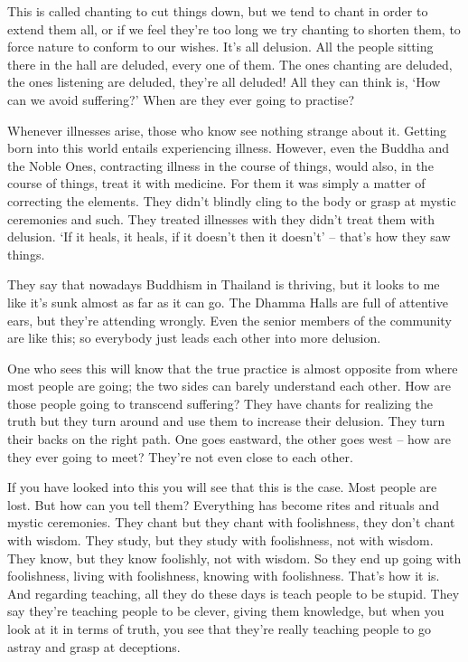 This is called chanting to cut things down, but we tend to chant in order to extend them all, or if we feel they're too long we try chanting to shorten them, to force nature to conform to our wishes. It's all delusion. All the people sitting there in the hall are deluded, every one of them. The ones chanting are deluded, the ones listening are deluded, they're all deluded! All they can think is, `How can we avoid suffering?' When are they ever going to practise?

Whenever illnesses arise, those who know see nothing strange about it. Getting born into this world entails experiencing illness. However, even the Buddha and the Noble Ones, contracting illness in the course of things, would also, in the course of things, treat it with medicine. For them it was simply a matter of correcting the elements. They didn't blindly cling to the body or grasp at mystic ceremonies and such. They treated illnesses with  they didn't treat them with delusion. `If it heals, it heals, if it doesn't then it doesn't' -- that's how they saw things.

They say that nowadays Buddhism in Thailand is thriving, but it looks to me like it's sunk almost as far as it can go. The Dhamma Halls are full of attentive ears, but they're attending wrongly. Even the senior members of the community are like this; so everybody just leads each other into more delusion.

One who sees this will know that the true practice is almost opposite from where most people are going; the two sides can barely understand each other. How are those people going to transcend suffering? They have chants for realizing the truth but they turn around and use them to increase their delusion. They turn their backs on the right path. One goes eastward, the other goes west -- how are they ever going to meet? They're not even close to each other.

If you have looked into this you will see that this is the case. Most people are lost. But how can you tell them? Everything has become rites and rituals and mystic ceremonies. They chant but they chant with foolishness, they don't chant with wisdom. They study, but they study with foolishness, not with wisdom. They know, but they know foolishly, not with wisdom. So they end up going with foolishness, living with foolishness, knowing with foolishness. That's how it is. And regarding teaching, all they do these days is teach people to be stupid. They say they're teaching people to be clever, giving them knowledge, but when you look at it in terms of truth, you see that they're really teaching people to go astray and grasp at deceptions.

